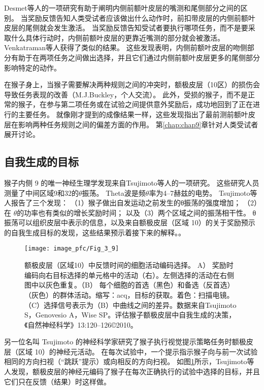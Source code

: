 Desmet等人\cite{desmet2011errors}的一项研究有助于阐明内侧前额叶皮层的嘴测和尾侧部分之间的区别。
当奖励反馈告知人类受试者应该做出什么动作时，前扣带皮层的内侧前额叶皮层的尾侧就会发生激活。
当奖励反馈告知受试者要执行哪项任务，而不是要采取什么具体行动时，内侧前额叶皮层的更靠近嘴测的部分就会被激活。
Venkatraman等人\cite{venkatraman2009resolving}获得了类似的结果。
这些发现表明，内侧前额叶皮层的吻侧部分有助于在两项任务之间做出选择，并且它们通过内侧前额叶皮层更多的尾侧部分影响特定的动作。\par


在猴子身上，当猴子需要解决两种规则之间的冲突时，额极皮层（10区）的损伤会导致任务表现的改善（M.J.Buckley，个人交流）。
此外，受损的猴子，而不是正常的猴子，在参与第二项任务或在试验之间提供意外奖励后，成功地回到了正在进行的主要任务。
就像刚才提到的成像结果一样，这些发现指出了最前测前额叶皮层在影响两种任务规则之间的偏差方面的作用。
第\ref{chap:chap9}章针对人类受试者展开讨论。\par



\subsection{自我生成的目标}

猴子内侧 9 的唯一神经生理学发现来自Tsujimoto等人\cite{tsujimoto2006direct}的一项研究。
这些研究人员测量了中间区域9和32的$\theta$振荡。
Theta波是频$\theta$率为4–7赫兹的电势。
Tsujimoto等人报告了三个发现：
（1）猴子做出自发运动之前发生的θ振荡的强度增加；
（2）在 $\theta$的功率也有类似的增长奖励时间；
以及（3）两个区域之间的振荡相干性。
θ振荡可以组织皮层中表示的信息，以及来自额极皮层（区域 10）的关于奖励预示的自我生成目标的发现，这些结果预示着接下来的解释。。\par


\begin{figure}[!htb]
	\centering
	\texttt{[image: image\_pfc/Fig\_3\_9]}
	\caption{额极皮层（区域10）中反馈时间的细胞活动编码选择。
		A） 奖励时编码向右目标选择的单元格中的活动（右）。左侧选择的活动在右侧图中以灰色重复。（B） 每个细胞的首选（黑色）和备选（反首选）（灰色）的群体活动。缩写：acq，目标的获取。着色：扫描电镜。（C）选择信号表示为（B）中曲线之间的差异。数据来自Tsujimoto S，Genovesio A，Wise SP。评估猴子额极皮层中自我生成的决策，《自然神经科学》13:120–126©2010。}
	\label{fig:3_9}
\end{figure}


另一位名叫 Tsujimoto 的神经科学家研究了猴子执行视觉提示策略任务时额极皮层（区域 10）的神经元活动\cite{tsujimoto2010evaluating}。
在每次试验中，一个提示指示猴子向与前一次试验相同的方向扫视（“跳跃”提示）或向相反的方向扫视。
如图\ref{fig:3_9}所示，Tsujimoto等人发现，额极皮层的神经元编码了猴子在每次正确执行的试验中选择的目标，并且它们只在反馈（结果）时这样做。\par


